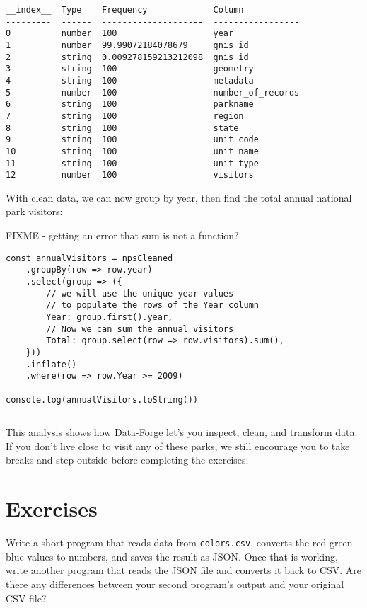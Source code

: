 \begin{verbatim}
__index__  Type    Frequency             Column           
---------  ------  --------------------  -----------------
0          number  100                   year                    
1          number  99.99072184078679     gnis_id          
2          string  0.009278159213212098  gnis_id          
3          string  100                   geometry         
4          string  100                   metadata         
5          number  100                   number_of_records
6          string  100                   parkname         
7          string  100                   region           
8          string  100                   state            
9          string  100                   unit_code        
10         string  100                   unit_name        
11         string  100                   unit_type        
12         number  100                   visitors     
\end{verbatim}

With clean data,
we can now group by year,
then find the total annual national park visitors:

FIXME - getting an error that sum is not a function?
\begin{verbatim}
const annualVisitors = npsCleaned
    .groupBy(row => row.year)
    .select(group => ({
        // we will use the unique year values
        // to populate the rows of the Year column
        Year: group.first().year,
        // Now we can sum the annual visitors
        Total: group.select(row => row.visitors).sum(),
    }))
    .inflate()
    .where(row => row.Year >= 2009)

console.log(annualVisitors.toString())
\end{verbatim}

\begin{verbatim}
\end{verbatim}

This analysis shows how
Data-Forge let's you inspect, clean, and transform data.
If you don't live close to visit any of these parks,
we still encourage you to take breaks and step outside
before completing the exercises.

\section{Exercises}\label{s:dataforge-exercises}


Write a short program that reads data from \texttt{colors.csv},
converts the red-green-blue values to numbers,
and saves the result as JSON.
Once that is working,
write another program that reads the JSON file and converts it back to CSV.
Are there any differences between your second program's output
and your original CSV file?


